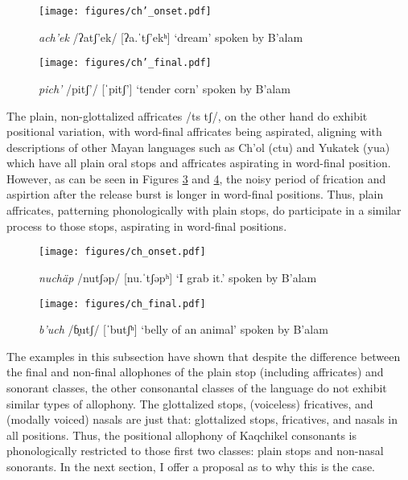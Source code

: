\documentclass[output=paper,colorlinks,citecolor=brown]{langscibook}
\begin{document}
\begin{figure}
\texttt{[image: figures/ch'\_onset.pdf]}
\caption{\emph{ach’ek} /ʔatʃ’ek/ [ʔa.ˈtʃ’ekʰ] ‘dream’ spoken by B’alam}
\label{ch’_onset}
\end{figure}

\begin{figure}
\texttt{[image: figures/ch'\_final.pdf]}
\caption{\emph{pich’} /pitʃ’/ [ˈpitʃ’] ‘tender corn’ spoken by B’alam}
\label{ch’_final}
\end{figure}

The plain, non-glottalized affricates /ts tʃ/, on the other hand do exhibit positional variation, with word-final affricates being aspirated, aligning with descriptions of other Mayan languages such as Ch’ol (ctu) \citep{warkentin_brend_1974} and Yukatek (yua) \citep{anderbois_2011} which have all plain oral stops and affricates aspirating in word-final position. However, as can be seen in Figures \ref{ch_onset} and \ref{ch_final}, the noisy period of frication and aspirtion after the release burst is longer in word-final positions. Thus, plain affricates, patterning phonologically with plain stops, do participate in a similar process to those stops, aspirating in word-final positions.

\begin{figure}
\texttt{[image: figures/ch\_onset.pdf]}
\caption{\emph{nuchäp} /nutʃəp/ [nu.ˈtʃəpʰ] ‘I grab it.’ spoken by B’alam}
\label{ch_onset}
\end{figure}


\begin{figure}
\texttt{[image: figures/ch\_final.pdf]}
\caption{\emph{b’uch} /ɓ̥utʃ/ [ˈbutʃʰ] ‘belly of an animal’ spoken by B’alam}
\label{ch_final}
\end{figure}


The examples in this subsection have shown that despite the difference between the final and non-final allophones of the plain stop (including affricates) and sonorant classes, the other consonantal classes of the language do not exhibit similar types of allophony. The glottalized stops, (voiceless) fricatives, and (modally voiced) nasals are just that: glottalized stops, fricatives, and nasals in all positions. Thus, the positional allophony of Kaqchikel consonants is phonologically restricted to those first two classes: plain stops and non-nasal sonorants. In the next section, I offer a proposal as to why this is the case.
\end{document}
